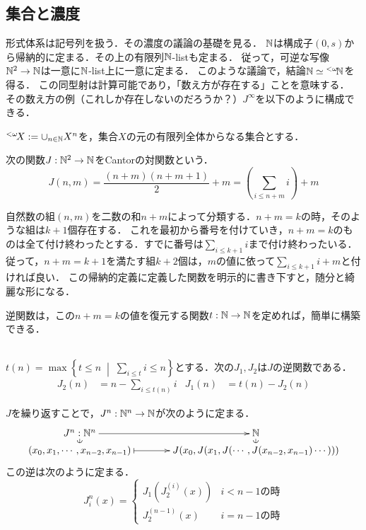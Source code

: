 \documentclass[uplatex, dvipdfmx]{jsreport}
\begin{document}
\subsection{集合と濃度}

\begin{screen}
形式体系は記号列を扱う．その濃度の議論の基礎を見る．
$\mathbb{N}$は構成子$(0,s)$から帰納的に定まる．その上の有限列$\mathbb{N}$-listも定まる．
従って，可逆な写像$\mathbb{N}^2\to\mathbb{N}$は一意に$\mathbb{N}$-list上に一意に定まる．
このような議論で，結論$\mathbb{N}\simeq{}^{<\omega}\!\mathbb{N}$を得る．
この同型射は計算可能であり，「数え方が存在する」ことを意味する．
その数え方の例（これしか存在しないのだろうか？）$J^\infty$を以下のように構成できる．
\end{screen}

\begin{notation}
    ${}^{<\omega}\!X:=\cup_{n\in\mathbb{N}}X^n$を，集合$X$の元の有限列全体からなる集合とする．
\end{notation}

\begin{definition}
    次の関数$J:\mathbb{N}^2\to\mathbb{N}$をCantorの対関数という．
    \[ J(n,m) = \frac{(n+m)(n+m+1)}{2} + m = \left(\sum_{i\le n+m}i\right) + m \]
\end{definition}
\begin{remark}
    自然数の組$(n,m)$を二数の和$n+m$によって分類する．$n+m=k$の時，そのような組は$k+1$個存在する．
    これを最初から番号を付けていき，$n+m=k$のものは全て付け終わったとする．すでに番号は$\sum_{i\le k+1}i$まで付け終わったいる．
    従って，$n+m=k+1$を満たす組$k+2$個は，$m$の値に依って$\sum_{i\le k+1}i+m$と付ければ良い．
    この帰納的定義に定義した関数を明示的に書き下すと，随分と綺麗な形になる．

    逆関数は，この$n+m=k$の値を復元する関数$t:\mathbb{N}\to\mathbb{N}$を定めれば，簡単に構築できる．
\end{remark}

\begin{proposition}\mbox{}\\
    $t(n)=\max\left\{t\le n\;\middle|\; \sum_{i\le t}i\le n\right\}$とする．次の$J_1,J_2$は$J$の逆関数である．
    \begin{align*}
        J_2(n) &= n-\sum_{i\le t(n)}i &J_1(n) &= t(n)-J_2(n)
    \end{align*}
\end{proposition}

\begin{remark}
    $J$を繰り返すことで，$J^n:\mathbb{N}^n\to\mathbb{N}$が次のように定まる．
    \[\xymatrix@C=36pt@R=2.8pt{
        J^n:\N^n \ar[r] & \N \\
        (x_0,x_1,\cdots,x_{n-2},x_{n-1}) \ar@{|->}[r] \ar@{(-}[u] & J(x_0,J(x_1,J(\cdots,J(x_{n-2},x_{n-1})\cdots))) \ar@{(-}[u]
    }\]
    この逆は次のように定まる．
    \[J_i^n(x)=\begin{cases}
        J_1(J_2^{(i)}(x)) &i<n-1の時\\
        J_2^{(n-1)}(x) & i=n-1の時
    \end{cases}\]
\end{remark}
\end{document}
